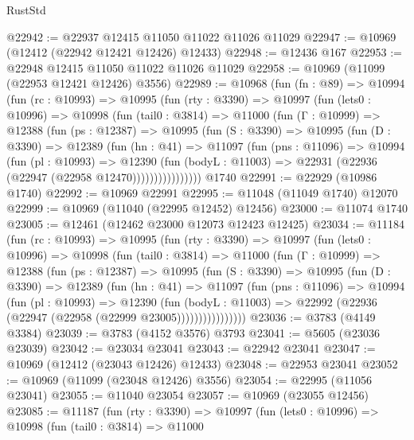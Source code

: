\begin{lexlean}{RustStd}
\begin{coremodule}
@22942 := @22937 @12415 @11050 @11022 @11026 @11029
@22947 := @10969 (@12412 (@22942 @12421 @12426) @12433)
@22948 := @12436 @167
@22953 := @22948 @12415 @11050 @11022 @11026 @11029
@22958 := @10969 (@11099 (@22953 @12421 @12426) @3556)
@22989 := @10968
    (fun (fn : @89) =>
    @10994
      (fun (rc : @10993) =>
      @10995
        (fun (rty : @3390) =>
        @10997
          (fun (lets0 : @10996) =>
          @10998
            (fun (tail0 : @3814) =>
            @11000
              (fun (Γ : @10999) =>
              @12388
                (fun (ps : @12387) =>
                @10995
                  (fun (S : @3390) =>
                  @10995
                    (fun (D : @3390) =>
                    @12389
                      (fun (hn : @41) =>
                      @11097
                        (fun (pns : @11096) =>
                        @10994
                          (fun (pl : @10993) =>
                          @12390
                            (fun (bodyL : @11003) =>
                            @22931 (@22936 (@22947 (@22958 @12470))))))))))))))))
    @1740
@22991 := @22929 (@10986 @1740)
@22992 := @10969 @22991
@22995 := @11048 (@11049 @1740) @12070
@22999 := @10969 (@11040 (@22995 @12452) @12456)
@23000 := @11074 @1740
@23005 := @12461 (@12462 @23000 @12073 @12423 @12425)
@23034 := @11184
    (fun (rc : @10993) =>
    @10995
      (fun (rty : @3390) =>
      @10997
        (fun (lets0 : @10996) =>
        @10998
          (fun (tail0 : @3814) =>
          @11000
            (fun (Γ : @10999) =>
            @12388
              (fun (ps : @12387) =>
              @10995
                (fun (S : @3390) =>
                @10995
                  (fun (D : @3390) =>
                  @12389
                    (fun (hn : @41) =>
                    @11097
                      (fun (pns : @11096) =>
                      @10994
                        (fun (pl : @10993) =>
                        @12390
                          (fun (bodyL : @11003) =>
                          @22992 (@22936 (@22947 (@22958 (@22999 @23005))))))))))))))))
@23036 := @3783 (@4149 @3384)
@23039 := @3783 (@4152 @3576) @3793
@23041 := @5605 (@23036 @23039)
@23042 := @23034 @23041
@23043 := @22942 @23041
@23047 := @10969 (@12412 (@23043 @12426) @12433)
@23048 := @22953 @23041
@23052 := @10969 (@11099 (@23048 @12426) @3556)
@23054 := @22995 (@11056 @23041)
@23055 := @11040 @23054
@23057 := @10969 (@23055 @12456)
@23085 := @11187
    (fun (rty : @3390) =>
    @10997
      (fun (lets0 : @10996) =>
      @10998
        (fun (tail0 : @3814) =>
        @11000

\end{coremodule}
\end{lexlean}
